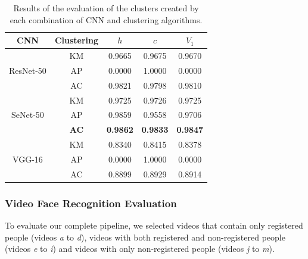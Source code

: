 \begin{table}[!ht]
\small
\centering
\caption{Results of the evaluation of the clusters created by each combination of CNN and clustering algorithms.}
\begin{tabular}{@{}ccccc@{}}
\toprule
\textbf{CNN} & \textbf{Clustering} & \textbf{$h$} & \textbf{$c$} & \textbf{$V_1$} \\ \midrule
                  & KM                  & 0.9665                     & 0.9675                      & 0.9670             \\
ResNet-50         & AP                  & 0.0000                     & 1.0000                      & 0.0000             \\
                  & AC                  & 0.9821                     & 0.9798                      & 0.9810             \\ \midrule
                  & KM                  & 0.9725                     & 0.9726                      & 0.9725             \\
SeNet-50          & AP                  & 0.9859                     & 0.9558                      & 0.9706             \\
                  & \textbf{AC}         & \textbf{0.9862}            & \textbf{0.9833}             & \textbf{0.9847}    \\ \midrule
                  & KM                  & 0.8340                     & 0.8415                      & 0.8378             \\
VGG-16            & AP                  & 0.0000                     & 1.0000                      & 0.0000             \\
                  & AC                  & 0.8899                     & 0.8929                      & 0.8914             \\
\end{tabular}
\label{tab:results_clustering}
\vspace{-1em}
\end{table}


\subsubsection{Video Face Recognition Evaluation}

To evaluate our complete pipeline, we selected videos that contain only registered people (videos \emph{a} to \emph{d}), videos with both registered and non-registered people (videos \emph{e} to \emph{i}) and videos with only non-registered people (videos \emph{j} to \emph{m}).

